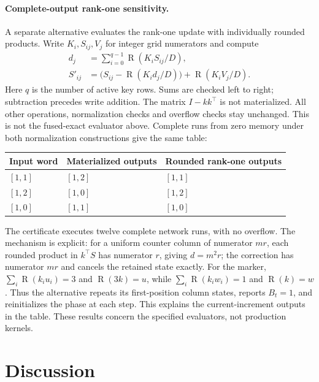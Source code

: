 \documentclass[10pt]{article}
\theoremstyle{remark}
\DeclareMathOperator{\R}{R}
\begin{document}
\paragraph{Complete-output rank-one sensitivity.}
A separate alternative evaluates the rank-one update with individually rounded
products. Write $K_i,S_{ij},V_j$ for integer grid numerators and compute
\begin{align*}
 d_j&=\sum_{i=0}^{q-1}\R(K_iS_{ij}/D),\\
 S'_{ij}&=\bigl(S_{ij}-\R(K_id_j/D)\bigr)+\R(K_iV_j/D).
\end{align*}
Here $q$ is the number of active key rows. Sums are checked left to right;
subtraction precedes write addition. The matrix $I-kk^\top$ is not materialized.
All other operations, normalization checks and overflow checks stay unchanged.
This is not the fused-exact evaluator above. Complete runs from zero memory
under both normalization constructions give the same table:
\begin{center}
\begin{tabular}{@{}lll@{}}
\toprule
Input word & Materialized outputs & Rounded rank-one outputs \\
\midrule
$[1,1]$ & $[1,2]$ & $[1,1]$ \\
$[1,2]$ & $[1,0]$ & $[1,2]$ \\
$[1,0]$ & $[1,1]$ & $[1,0]$ \\
\bottomrule
\end{tabular}
\end{center}
The certificate executes twelve complete network runs, with no overflow.
The mechanism is explicit: for a uniform counter column of numerator $mr$,
each rounded product in $k^\top S$ has numerator $r$, giving $d=m^2r$;
the correction has numerator $mr$ and cancels the retained state exactly.
For the marker, $\sum_i\R(k_i u_i)=3$ and $\R(3k)=u$, while
$\sum_i\R(k_i w_i)=1$ and $\R(k)=w$. Thus the alternative repeats its
first-position column states, reports $B_t=1$, and reinitializes the phase
at each step. This explains the current-increment outputs in the table.
These results concern the specified evaluators, not production kernels.

\section{Discussion}
\end{document}
